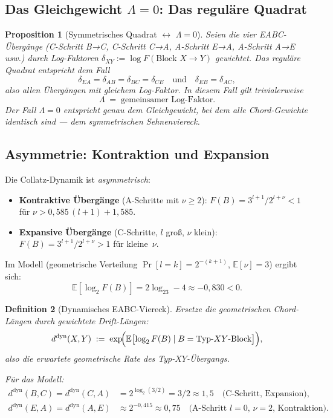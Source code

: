 \documentclass[12pt,a4paper]{article}
\newtheorem{definition}{Definition}[section]
\newtheorem{proposition}[definition]{Proposition}
\newcommand{\E}{\mathbb{E}}
\newcommand{\logt}{\log_2}
\begin{document}
\subsection{Das Gleichgewicht $\Lambda = 0$: Das reguläre Quadrat}

\begin{proposition}[Symmetrisches Quadrat $\leftrightarrow$ $\Lambda = 0$]
\label{prop:gleichgewicht}
Seien die vier EABC-Übergänge (C-Schritt B→C, C-Schritt C→A, A-Schritt E→A,
A-Schritt A→E usw.) durch Log-Faktoren $\delta_{XY} := \log F(\text{Block } X\to Y)$
gewichtet. Das reguläre Quadrat entspricht dem Fall
\[
  \delta_{EA} = \delta_{AB} = \delta_{BC} = \delta_{CE}
  \quad\text{und}\quad
  \delta_{EB} = \delta_{AC},
\]
also allen Übergängen mit gleichem Log-Faktor. In diesem Fall gilt trivialerweise
\[
  \Lambda \;=\; \text{gemeinsamer Log-Faktor}.
\]
Der Fall $\Lambda = 0$ entspricht \emph{genau} dem Gleichgewicht, bei dem
alle Chord-Gewichte identisch sind --- dem symmetrischen Sehnenviereck.
\end{proposition}

\subsection{Asymmetrie: Kontraktion und Expansion}

Die Collatz-Dynamik ist \emph{asymmetrisch}:
\begin{itemize}[leftmargin=*]
  \item \textbf{Kontraktive Übergänge} (A-Schritte mit $\nu \geq 2$):
    $F(B) = 3^{l+1}/2^{l+\nu} < 1$ für $\nu > 0{,}585\,(l+1) + 1{,}585$.
  \item \textbf{Expansive Übergänge} (C-Schritte, $l$ groß, $\nu$ klein):
    $F(B) = 3^{l+1}/2^{l+\nu} > 1$ für kleine~$\nu$.
\end{itemize}
Im Modell (geometrische Verteilung $\Pr[l=k] = 2^{-(k+1)}$, $\E[\nu]=3$)
ergibt sich:
\[
  \E[\logt F(B)] = 2\logt 3 - 4 \approx -0{,}830 < 0.
\]

\begin{definition}[Dynamisches EABC-Viereck]
\label{def:dyn-viereck}
Ersetze die geometrischen Chord-Längen durch gewichtete \emph{Drift-Längen}:
\[
  d^{\mathrm{dyn}}(X,Y) \;:=\;
  \exp\!\Bigl(\E\bigl[\logt F(B) \mid B = \text{Typ-}XY\text{-Block}\bigr]\Bigr),
\]
also die erwartete geometrische Rate des Typ-$XY$-Übergangs.

Für das Modell:
\begin{align*}
  d^{\mathrm{dyn}}(B,C) = d^{\mathrm{dyn}}(C,A) &= 2^{\logt(3/2)} = 3/2 \approx 1{,}5
    \quad\text{(C-Schritt, Expansion)},\\
  d^{\mathrm{dyn}}(E,A) = d^{\mathrm{dyn}}(A,E) &\approx 2^{-0{,}415} \approx 0{,}75
    \quad\text{(A-Schritt $l=0$, $\nu=2$, Kontraktion)}.
\end{align*}
\end{definition}
\end{document}
